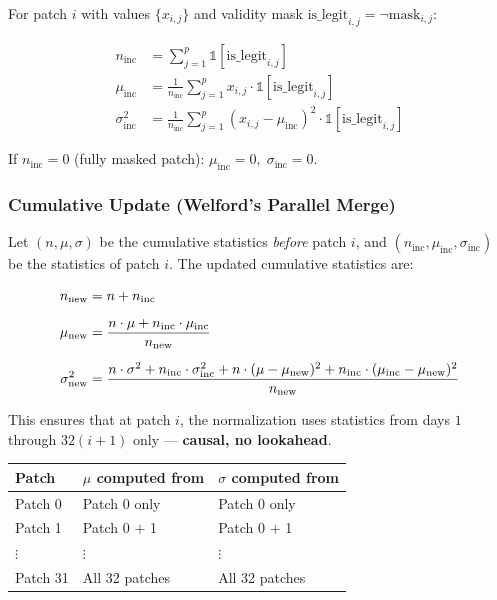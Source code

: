 \documentclass[11pt,a4paper]{article}
\begin{document}
For patch $i$ with values $\{x_{i,j}\}$ and validity mask $\text{is\_legit}_{i,j} = \neg\text{mask}_{i,j}$:

\begin{align}
n_{\text{inc}} &= \sum_{j=1}^{p} \mathbb{1}[\text{is\_legit}_{i,j}] \label{eq:inc_n} \\[4pt]
\mu_{\text{inc}} &= \frac{1}{n_{\text{inc}}} \sum_{j=1}^{p} x_{i,j} \cdot \mathbb{1}[\text{is\_legit}_{i,j}] \label{eq:inc_mu} \\[4pt]
\sigma^2_{\text{inc}} &= \frac{1}{n_{\text{inc}}} \sum_{j=1}^{p} (x_{i,j} - \mu_{\text{inc}})^2 \cdot \mathbb{1}[\text{is\_legit}_{i,j}] \label{eq:inc_var}
\end{align}

\noindent
If $n_{\text{inc}} = 0$ (fully masked patch): $\mu_{\text{inc}} = 0,\; \sigma_{\text{inc}} = 0$.

\subsubsection{Cumulative Update (Welford's Parallel Merge)}

Let $(n, \mu, \sigma)$ be the cumulative statistics \emph{before} patch $i$, and $(n_{\text{inc}}, \mu_{\text{inc}}, \sigma_{\text{inc}})$ be the statistics of patch $i$. The updated cumulative statistics are:

\begin{align}
n_{\text{new}} &= n + n_{\text{inc}} \label{eq:new_n} \\[6pt]
\mu_{\text{new}} &= \frac{n \cdot \mu + n_{\text{inc}} \cdot \mu_{\text{inc}}}{n_{\text{new}}} \label{eq:new_mu} \\[6pt]
\sigma^2_{\text{new}} &= \frac{%
    n \cdot \sigma^2
    + n_{\text{inc}} \cdot \sigma^2_{\text{inc}}
    + n \cdot (\mu - \mu_{\text{new}})^2
    + n_{\text{inc}} \cdot (\mu_{\text{inc}} - \mu_{\text{new}})^2
}{n_{\text{new}}} \label{eq:new_var}
\end{align}

\noindent
This ensures that at patch $i$, the normalization uses statistics from days $1$ through $32(i+1)$ only --- \textbf{causal, no lookahead}.

\begin{center}
\begin{tabular}{@{}lll@{}}
\toprule
\textbf{Patch} & $\mu$ \textbf{computed from} & $\sigma$ \textbf{computed from} \\
\midrule
Patch 0 & Patch 0 only & Patch 0 only \\
Patch 1 & Patch 0 $+$ 1 & Patch 0 $+$ 1 \\
$\vdots$ & $\vdots$ & $\vdots$ \\
Patch 31 & All 32 patches & All 32 patches \\
\bottomrule
\end{tabular}
\end{center}
\end{document}
